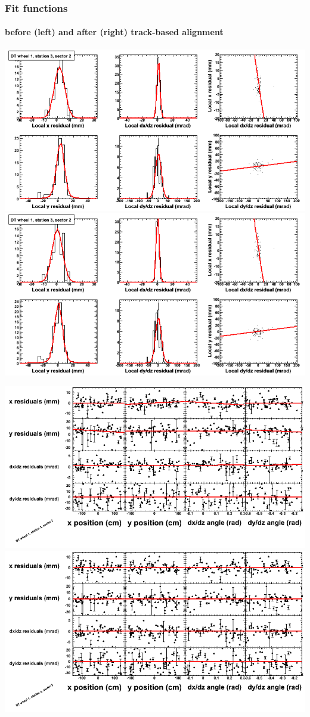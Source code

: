 \documentclass[compress]{beamer}
\begin{document}
\begin{frame}
\frametitle{Fit functions}
\framesubtitle{before (left) and after (right) track-based alignment}
\includegraphics[width=0.5\linewidth]{fitfunctions_re01/MBwhDst3sec02_bellcurves.png} \includegraphics[width=0.5\linewidth]{fitfunctions_re05/MBwhDst3sec02_bellcurves.png}

\includegraphics[width=0.5\linewidth]{fitfunctions_re01/MBwhDst3sec02_polynomials.png} \includegraphics[width=0.5\linewidth]{fitfunctions_re05/MBwhDst3sec02_polynomials.png}
\end{frame}
\end{document}
